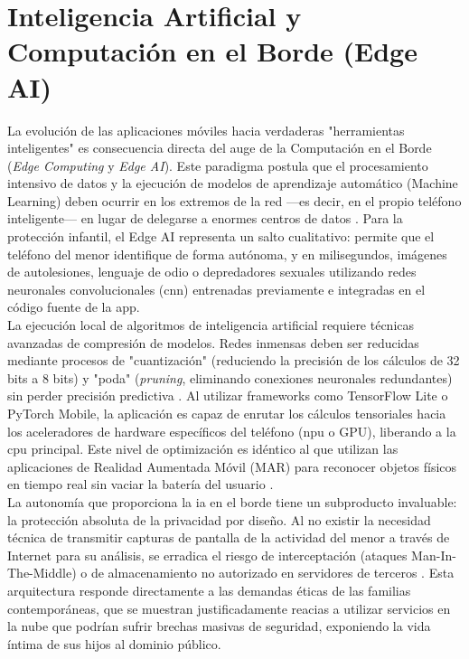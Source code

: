 \section{Inteligencia Artificial y Computación en el Borde (Edge AI)}

La evolución de las aplicaciones móviles hacia verdaderas "herramientas inteligentes" es consecuencia directa del auge de la Computación en el Borde (\textit{Edge Computing} y \textit{Edge AI}). Este paradigma postula que el procesamiento intensivo de datos y la ejecución de modelos de aprendizaje automático (Machine Learning) deben ocurrir en los extremos de la red —es decir, en el propio teléfono inteligente— en lugar de delegarse a enormes centros de datos \cite{sahu_edge_2025}. Para la protección infantil, el Edge AI representa un salto cualitativo: permite que el teléfono del menor identifique de forma autónoma, y en milisegundos, imágenes de autolesiones, lenguaje de odio o depredadores sexuales utilizando redes neuronales convolucionales (\gls{cnn}) entrenadas previamente e integradas en el código fuente de la app.\\



La ejecución local de algoritmos de inteligencia artificial requiere técnicas avanzadas de compresión de modelos. Redes inmensas deben ser reducidas mediante procesos de "cuantización" (reduciendo la precisión de los cálculos de 32 bits a 8 bits) y "poda" (\textit{pruning}, eliminando conexiones neuronales redundantes) sin perder precisión predictiva \cite{surianarayanan_survey_2023}. Al utilizar frameworks como TensorFlow Lite o PyTorch Mobile, la aplicación es capaz de enrutar los cálculos tensoriales hacia los aceleradores de hardware específicos del teléfono (\gls{npu} o GPU), liberando a la \gls{cpu} principal. Este nivel de optimización es idéntico al que utilizan las aplicaciones de Realidad Aumentada Móvil (MAR) para reconocer objetos físicos en tiempo real sin vaciar la batería del usuario \cite{cao_mobile_2023}.\\

La autonomía que proporciona la \gls{ia} en el borde tiene un subproducto invaluable: la protección absoluta de la privacidad por diseño. Al no existir la necesidad técnica de transmitir capturas de pantalla de la actividad del menor a través de Internet para su análisis, se erradica el riesgo de interceptación (ataques Man-In-The-Middle) o de almacenamiento no autorizado en servidores de terceros \cite{ali_getting_2023, feal_angel_2020}. Esta arquitectura responde directamente a las demandas éticas de las familias contemporáneas, que se muestran justificadamente reacias a utilizar servicios en la nube que podrían sufrir brechas masivas de seguridad, exponiendo la vida íntima de sus hijos al dominio público.\\

